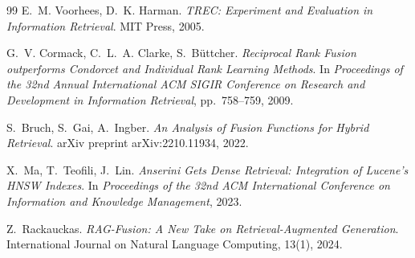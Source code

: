 \documentclass[runningheads,a4paper]{llncs}
\begin{document}
\begin{thebibliography}{99}
E.~M. Voorhees, D.~K. Harman.
\newblock \textit{TREC: Experiment and Evaluation in Information Retrieval}.
\newblock MIT Press, 2005.

G.~V. Cormack, C.~L.~A. Clarke, S.~B{\"u}ttcher.
\newblock \textit{Reciprocal Rank Fusion outperforms Condorcet and Individual Rank Learning Methods}.
\newblock In \textit{Proceedings of the 32nd Annual International ACM SIGIR Conference on Research and Development in Information Retrieval}, pp.~758--759, 2009.

S.~Bruch, S.~Gai, A.~Ingber.
\newblock \textit{An Analysis of Fusion Functions for Hybrid Retrieval}.
\newblock arXiv preprint arXiv:2210.11934, 2022.

X.~Ma, T.~Teofili, J.~Lin.
\newblock \textit{Anserini Gets Dense Retrieval: Integration of Lucene's HNSW Indexes}.
\newblock In \textit{Proceedings of the 32nd ACM International Conference on Information and Knowledge Management}, 2023.

Z.~Rackauckas.
\newblock \textit{RAG-Fusion: A New Take on Retrieval-Augmented Generation}.
\newblock International Journal on Natural Language Computing, 13(1), 2024.

\end{thebibliography}
\end{document}
